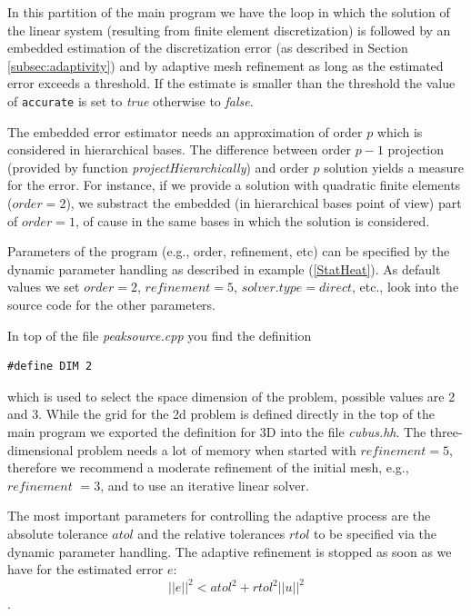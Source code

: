 \documentclass[11pt]{article}
\begin{document}
In this partition of the main program we have the loop in which  the solution of
the linear system (resulting from finite element discretization) is
followed by an embedded estimation of the discretization error (as described
in Section \ref{subsec:adaptivity}) and by adaptive mesh refinement as long as the 
estimated error exceeds a threshold. If the estimate is smaller than
the threshold the value of
{\tt accurate} is set to {\em true} otherwise to {\em false}.

The embedded error estimator needs an approximation of order $p$ which
is considered in hierarchical bases. The difference between order $p-1$ projection
(provided by function {\em projectHierarchically})
and order $p$ solution yields a measure for the error. For instance, if we provide
a solution with quadratic finite elements ($order = 2$), we substract the embedded
(in hierarchical bases point of view) part of $order = 1$, of cause in the same
bases in which the solution is considered.

Parameters of the program (e.g., order, refinement, etc) 
can be specified by the dynamic parameter handling as described in
example (\ref{StatHeat}). As default values we set $order = 2$, $refinement=5$,
$solver.type = direct$, etc., look into the source code for the other parameters.

In top of the file {\em peaksource.cpp} you find the definition 

\begin{lstlisting}
#define DIM 2
\end{lstlisting}
which is used to select the space dimension of the problem, possible values are 2 and 3.
While the grid for the 2d problem is defined directly in the top of the main program
we exported the definition for 3D into the file {\em cubus.hh}.
The three-dimensional problem needs a lot of memory when started with $refinement=5$,
therefore we recommend a moderate refinement of the initial mesh, e.g., $refinement$ $=3$,
and to use an iterative linear solver.

The most important parameters for controlling the adaptive process are the
absolute tolerance $atol$ and the relative tolerances $rtol$ to be specified via
the dynamic parameter handling. The adaptive
refinement is stopped as soon as we have for the estimated error $e$:
\[ ||e||^2 < atol^2 + rtol^2 ||u||^2 \].
\end{document}
